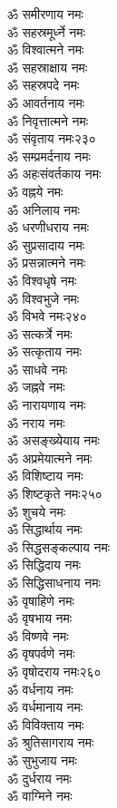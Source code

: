 \begin{multicols}{2}
\begin{flushleft}
ॐ समीरणाय नमः\\
ॐ सहस्रमूर्ध्ने नमः\\
ॐ विश्वात्मने नमः\\
ॐ सहस्राक्षाय नमः\\
ॐ सहस्रपदे नमः\\
ॐ आवर्तनाय नमः\\
ॐ निवृत्तात्मने नमः\\
ॐ संवृताय नमः\hfill २३०\\
ॐ सम्प्रमर्दनाय नमः\\
ॐ अहःसंवर्तकाय नमः\\
ॐ वह्नये नमः\\
ॐ अनिलाय नमः\\
ॐ धरणीधराय नमः\\
ॐ सुप्रसादाय नमः\\
ॐ प्रसन्नात्मने नमः\\
ॐ विश्वधृषे नमः\\
ॐ विश्वभुजे नमः\\
ॐ विभवे नमः\hfill २४०\\
ॐ सत्कर्त्रे नमः\\
ॐ सत्कृताय नमः\\
ॐ साधवे नमः\\
ॐ जह्नवे नमः\\
ॐ नारायणाय नमः\\
ॐ नराय नमः\\
ॐ असङ्ख्येयाय नमः\\
ॐ अप्रमेयात्मने नमः\\
ॐ विशिष्टाय नमः\\
ॐ शिष्टकृते नमः\hfill २५०\\
ॐ शुचये नमः\\
ॐ सिद्धार्थाय नमः\\
ॐ सिद्धसङ्कल्पाय नमः\\
ॐ सिद्धिदाय नमः\\
ॐ सिद्धिसाधनाय नमः\\
ॐ वृषाहिणे नमः\\
ॐ वृषभाय नमः\\
ॐ विष्णवे नमः\\
ॐ वृषपर्वणे नमः\\
ॐ वृषोदराय नमः\hfill २६०\\
ॐ वर्धनाय नमः\\
ॐ वर्धमानाय नमः\\
ॐ विविक्ताय नमः\\
ॐ श्रुतिसागराय नमः\\
ॐ सुभुजाय नमः\\
ॐ दुर्धराय नमः\\
ॐ वाग्मिने नमः\\

\end{flushleft}
\end{multicols}
